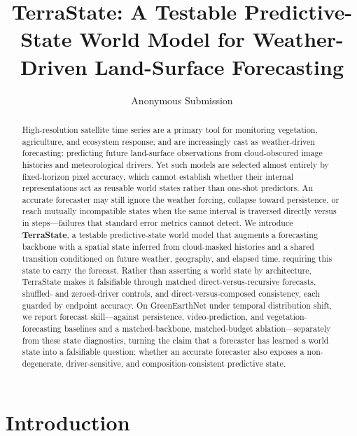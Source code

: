 \documentclass[letterpaper]{article} %
\title{TerraState: A Testable Predictive-State World Model for Weather-Driven Land-Surface Forecasting}
\author{Anonymous Submission}
\begin{document}
\maketitle

\begin{abstract}
High-resolution satellite time series are a primary tool for monitoring vegetation, agriculture, and ecosystem response, and are increasingly cast as weather-driven forecasting: predicting future land-surface observations from cloud-obscured image histories and meteorological drivers. Yet such models are selected almost entirely by fixed-horizon pixel accuracy, which cannot establish whether their internal representations act as reusable world states rather than one-shot predictors. An accurate forecaster may still ignore the weather forcing, collapse toward persistence, or reach mutually incompatible states when the same interval is traversed directly versus in steps---failures that standard error metrics cannot detect. We introduce \textbf{TerraState}, a testable predictive-state world model that augments a forecasting backbone with a spatial state inferred from cloud-masked histories and a shared transition conditioned on future weather, geography, and elapsed time, requiring this state to carry the forecast. Rather than asserting a world state by architecture, TerraState makes it falsifiable through matched direct-versus-recursive forecasts, shuffled- and zeroed-driver controls, and direct-versus-composed consistency, each guarded by endpoint accuracy. On GreenEarthNet under temporal distribution shift, we report forecast skill---against persistence, video-prediction, and vegetation-forecasting baselines and a matched-backbone, matched-budget ablation---separately from these state diagnostics, turning the claim that a forecaster has learned a world state into a falsifiable question: whether an accurate forecaster also exposes a non-degenerate, driver-sensitive, and composition-consistent predictive state.
\end{abstract}

\section{Introduction}
\end{document}
